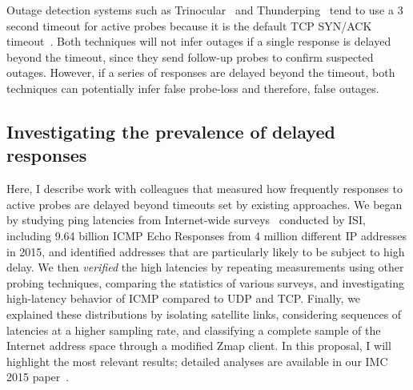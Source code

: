 
Outage detection systems such as Trinocular~\cite{trinocular}
and Thunderping~\cite{pingin} tend to use a 3 second timeout for active
probes because it is the default TCP SYN/ACK
timeout~\cite{rfc1122}. Both techniques will not infer outages if a
single response is delayed beyond the timeout, since they send
follow-up probes to confirm suspected outages. However, if a series of
responses are delayed beyond the timeout, both techniques can
potentially infer false probe-loss and therefore, false
outages. %

\subsection{Investigating the prevalence of delayed responses}

Here, I describe work with colleagues that measured how frequently responses
to active probes are delayed beyond timeouts set by existing
approaches. We began by studying ping latencies from Internet-wide surveys~\cite{census-survey} conducted by ISI,
including 9.64 billion ICMP Echo Responses from 4 million different IP
addresses in 2015, and identified addresses that are particularly likely
to be subject to high delay.  We then \emph{verified} the high latencies
by repeating measurements using other probing techniques, comparing the
statistics of various surveys, and investigating high-latency
behavior of ICMP compared to UDP and TCP.  Finally, we
explained these distributions by isolating satellite links,
considering sequences of latencies at a higher sampling rate,
and classifying a complete sample of the Internet address
space through a modified Zmap client. In this proposal, I will highlight
the most relevant results; detailed analyses are available in our IMC
2015 paper~\cite{timeouts}.

